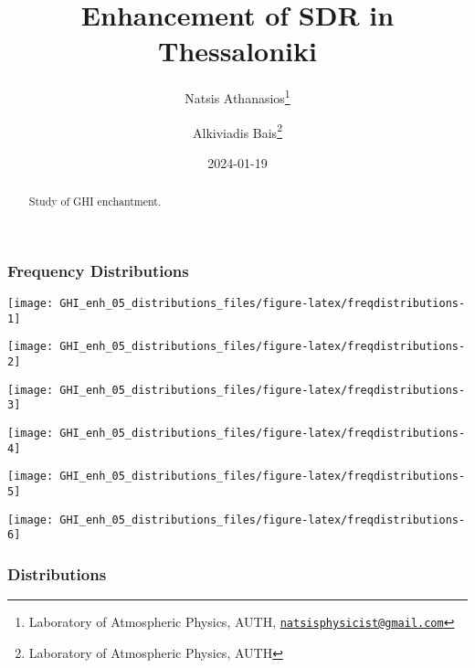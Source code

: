 \documentclass[
  10pt,
  a4paper,oneside]{article}
\title{Enhancement of SDR in Thessaloniki}
\author{Natsis Athanasios\footnote{Laboratory of Atmospheric Physics, AUTH, \href{mailto:natsisphysicist@gmail.com}{\nolinkurl{natsisphysicist@gmail.com}}} \and Alkiviadis Bais\footnote{Laboratory of Atmospheric Physics, AUTH}}
\date{2024-01-19}
\begin{document}
\maketitle
\begin{abstract}
Study of GHI enchantment.
\end{abstract}

{
\hypersetup{linkcolor=}
\setcounter{tocdepth}{4}
\tableofcontents
}
\FloatBarrier

\hypertarget{frequency-distributions}{%
\subsubsection{Frequency Distributions}\label{frequency-distributions}}

\begin{center}\texttt{[image: GHI\_enh\_05\_distributions\_files/figure-latex/freqdistributions-1]} \end{center}

\begin{center}\texttt{[image: GHI\_enh\_05\_distributions\_files/figure-latex/freqdistributions-2]} \end{center}

\begin{center}\texttt{[image: GHI\_enh\_05\_distributions\_files/figure-latex/freqdistributions-3]} \end{center}

\begin{center}\texttt{[image: GHI\_enh\_05\_distributions\_files/figure-latex/freqdistributions-4]} \end{center}

\begin{center}\texttt{[image: GHI\_enh\_05\_distributions\_files/figure-latex/freqdistributions-5]} \end{center}

\begin{center}\texttt{[image: GHI\_enh\_05\_distributions\_files/figure-latex/freqdistributions-6]} \end{center}

\FloatBarrier

\hypertarget{distributions}{%
\subsubsection{Distributions}\label{distributions}}
\end{document}
